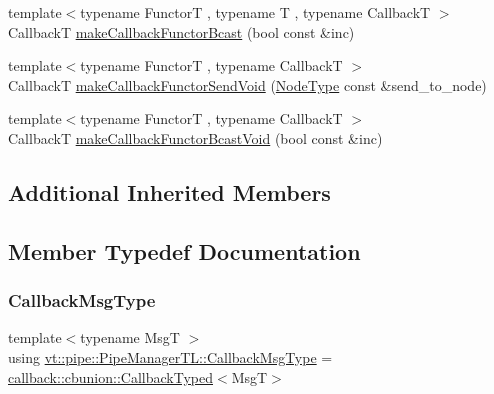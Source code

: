\begin{DoxyCompactItemize}
\item 
{\footnotesize template$<$typename FunctorT , typename T , typename CallbackT $>$ }\\CallbackT \hyperlink{structvt_1_1pipe_1_1_pipe_manager_t_l_abb18372fac34782285cdb5d84f4ab449}{make\+Callback\+Functor\+Bcast} (bool const \&inc)
\item 
{\footnotesize template$<$typename FunctorT , typename CallbackT $>$ }\\CallbackT \hyperlink{structvt_1_1pipe_1_1_pipe_manager_t_l_a71bfb005f664ca5f0f6935afbcdb17de}{make\+Callback\+Functor\+Send\+Void} (\hyperlink{namespacevt_a866da9d0efc19c0a1ce79e9e492f47e2}{Node\+Type} const \&send\+\_\+to\+\_\+node)
\item 
{\footnotesize template$<$typename FunctorT , typename CallbackT $>$ }\\CallbackT \hyperlink{structvt_1_1pipe_1_1_pipe_manager_t_l_abca9b24d9d37eb7b3ca6bb3c62160889}{make\+Callback\+Functor\+Bcast\+Void} (bool const \&inc)
\end{DoxyCompactItemize}
\subsection*{Additional Inherited Members}


\subsection{Member Typedef Documentation}
\mbox{\label{structvt_1_1pipe_1_1_pipe_manager_t_l_af6fc2c17f1729fa06450441b0ee81cb1}} 
\subsubsection{\texorpdfstring{Callback\+Msg\+Type}{CallbackMsgType}}
{\footnotesize\ttfamily template$<$typename MsgT $>$ \\
using \hyperlink{structvt_1_1pipe_1_1_pipe_manager_t_l_af6fc2c17f1729fa06450441b0ee81cb1}{vt\+::pipe\+::\+Pipe\+Manager\+T\+L\+::\+Callback\+Msg\+Type} =  \hyperlink{structvt_1_1pipe_1_1callback_1_1cbunion_1_1_callback_typed}{callback\+::cbunion\+::\+Callback\+Typed}$<$MsgT$>$}

\mbox{\label{structvt_1_1pipe_1_1_pipe_manager_t_l_a1cc1d0f1c80a36488f9b5d282e9755d2}} 
